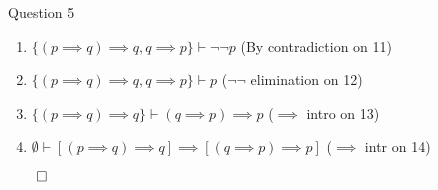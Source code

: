 \documentclass{beamer}
\begin{document}
{\begin{frame}{Question 5}
\begin{enumerate}
                \item $\{(p \implies q) \implies q, q \implies p\} \vdash \neg \neg p$ (By contradiction on 11)
                \item $\{(p \implies q) \implies q, q \implies p\} \vdash p$ ($\neg \neg$ elimination on 12)
                \item $\{(p \implies q) \implies q\} \vdash (q \implies p) \implies p$ ($\implies$ intro on 13)
                \item $\emptyset \vdash \left[(p \implies q) \implies q\right] \implies \left[(q \implies p) \implies p\right]$ ($\implies$ intr on 14)
            \end{enumerate}
            $\qed$
        \end{frame}
}
\end{document}
